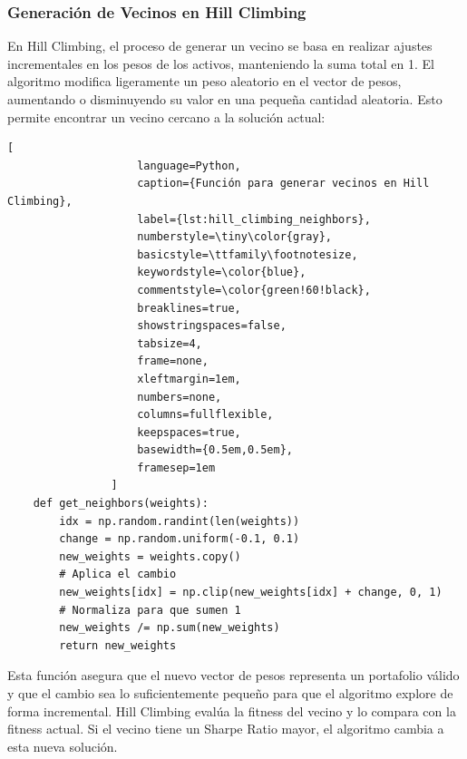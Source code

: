 \documentclass[9pt,a4paper,twoside]{rho-class/rho}
\begin{document}
            \subsubsection{Generación de Vecinos en Hill Climbing}
                En Hill Climbing, el proceso de generar un vecino se basa en realizar ajustes incrementales en los pesos de los activos, manteniendo la suma total en 1. El algoritmo modifica ligeramente un peso aleatorio en el vector de pesos, aumentando o disminuyendo su valor en una pequeña cantidad aleatoria. Esto permite encontrar un vecino cercano a la solución actual:
                \begin{lstlisting}[
                    language=Python,
                    caption={Función para generar vecinos en Hill Climbing},
                    label={lst:hill_climbing_neighbors},
                    numberstyle=\tiny\color{gray},
                    basicstyle=\ttfamily\footnotesize,
                    keywordstyle=\color{blue},
                    commentstyle=\color{green!60!black},
                    breaklines=true,
                    showstringspaces=false,
                    tabsize=4,
                    frame=none,
                    xleftmargin=1em,
                    numbers=none,
                    columns=fullflexible,
                    keepspaces=true,
                    basewidth={0.5em,0.5em},
                    framesep=1em
                ]
    def get_neighbors(weights):
        idx = np.random.randint(len(weights))
        change = np.random.uniform(-0.1, 0.1)
        new_weights = weights.copy()
        # Aplica el cambio
        new_weights[idx] = np.clip(new_weights[idx] + change, 0, 1)  
        # Normaliza para que sumen 1
        new_weights /= np.sum(new_weights)  
        return new_weights
                \end{lstlisting}
                Esta función asegura que el nuevo vector de pesos representa un portafolio válido y que el cambio sea lo suficientemente pequeño para que el algoritmo explore de forma incremental. Hill Climbing evalúa la fitness del vecino y lo compara con la fitness actual. Si el vecino tiene un Sharpe Ratio mayor, el algoritmo cambia a esta nueva solución.
            
\end{document}
